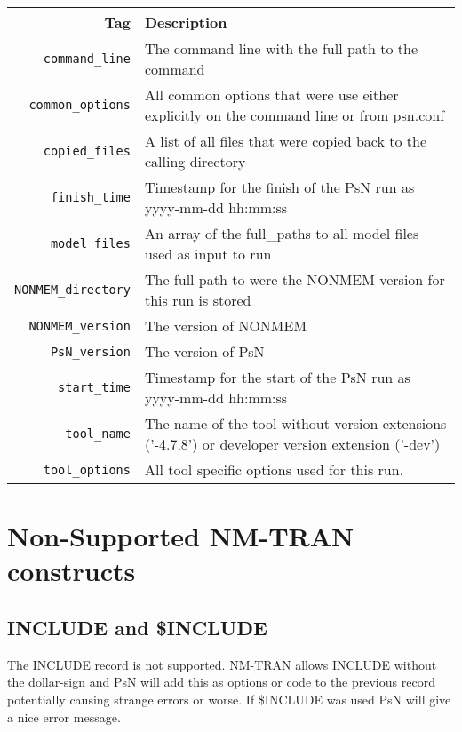 \begin{center}
    \begin{tabularx}{\linewidth}{ r X }
    \hline
    Tag & Description \\ \hline
    \verb|command_line| & The command line with the full path to the command \\ \hline
    \verb|common_options| & All common options that were use either explicitly on the command line or from psn.conf \\ \hline
    \verb|copied_files| & A list of all files that were copied back to the calling directory \\ \hline
    \verb|finish_time| & Timestamp for the finish of the PsN run as yyyy-mm-dd hh:mm:ss \\ \hline
    \verb|model_files| & An array of the full\_paths to all model files used as input to run \\ \hline
    \verb|NONMEM_directory| & The full path to were the NONMEM version for this run is stored \\ \hline
    \verb|NONMEM_version| & The version of NONMEM \\ \hline
    \verb|PsN_version| & The version of PsN \\ \hline
    \verb|start_time| & Timestamp for the start of the PsN run as yyyy-mm-dd hh:mm:ss \\ \hline
    \verb|tool_name| & The name of the tool without version extensions \mbox{('-4.7.8')} or developer version extension ('-dev') \\ \hline
    \verb|tool_options| & All tool specific options used for this run. \\ \hline
  \end{tabularx}
\end{center}

\section{Non-Supported NM-TRAN constructs}

\subsection{INCLUDE and \$INCLUDE}
The INCLUDE record is not supported. NM-TRAN allows INCLUDE without the dollar-sign and PsN will add this as options or code to the previous record potentially causing strange errors or worse. If \$INCLUDE was used PsN will give a nice error message.


